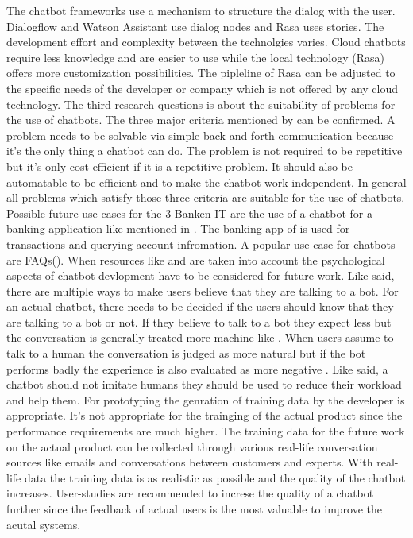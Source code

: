 The chatbot frameworks use a mechanism to structure the dialog with the user.
Dialogflow and Watson Assistant use dialog nodes and Rasa uses stories.
The development effort and complexity between the technolgies varies.
Cloud chatbots require less knowledge and are easier to use while the local technology (Rasa) 
offers more customization possibilities.
The pipleline of Rasa can be adjusted to the specific needs of the developer or company which 
is not offered by any cloud technology.
The third research questions is about the suitability of problems for the use of chatbots.
The three major criteria mentioned by \citet{singhbuilding} can be confirmed.
A problem needs to be solvable via simple back and forth communication because it's the 
only thing a chatbot can do.
The problem is not required to be repetitive but it's only cost efficient if it is 
a repetitive problem.
It should also be automatable to be efficient and to make the chatbot work independent.
In general all problems which satisfy those three criteria are suitable for the use of chatbots.
Possible future use cases for the 3 Banken IT are the use of a chatbot for a banking
application like mentioned in \citet{singhbuilding}.
The banking app of \cite{singhbuilding} is used for transactions and querying account infromation.
A popular use case for chatbots are FAQs(\citet{evaluateChatbotsShawar2007, buiildChatbotsPython, huang2007extracting, GO2019304}).
When resources like \citet{} and \citet{} are taken into account the psychological aspects of 
chatbot devlopment have to be considered for future work.
Like \citet{GO2019304} said, there are multiple ways to make users believe that they are talking to a bot.
For an actual chatbot, there needs to be decided if the users should know that they are talking to a bot or not.
If they believe to talk to a bot they expect less but the conversation is generally treated more machine-like \cite{GO2019304}.
When users assume to talk to a human the conversation is judged as more natural but if the bot performs badly the experience is also evaluated as more negative \cite{GO2019304}.
Like \citet{shawar2007chatbots} said, a chatbot should not imitate humans they should be used to reduce their workload and help them.
For prototyping the genration of training data by the developer is appropriate.
It's not appropriate for the trainging of the actual product since the performance
requirements are much higher.
The training data for the future work on the actual product can be collected through various
real-life conversation sources like emails and conversations between customers and experts.
With real-life data the training data is as realistic as possible and the quality of the chatbot 
increases.
User-studies are recommended to increse the quality of a chatbot further since the feedback 
of actual users is the most valuable to improve the acutal systems.
